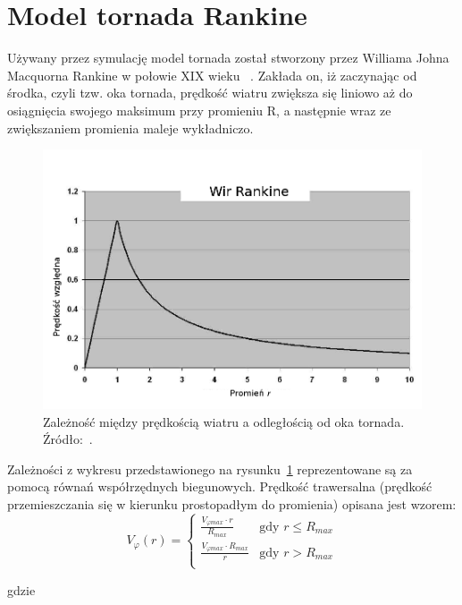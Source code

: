\section{Model tornada Rankine}

Używany przez symulację model tornada został stworzony przez Williama Johna Macquorna Rankine  w połowie XIX wieku ~\cite{dbg_vortex}. Zakłada on, iż zaczynając od środka, czyli tzw. oka tornada, prędkość wiatru zwiększa się liniowo aż do osiągnięcia swojego maksimum przy promieniu R, a następnie wraz ze zwiększaniem promienia maleje wykładniczo. 

\begin{figure}[!h]
	\center
	\includegraphics[scale=0.45]{rankine1}
	\caption{Zależność między prędkością wiatru a odległością od oka tornada. Źródło:~\cite{ktk_vortex}.}
	\label{fig:rankine1}
\end{figure} 

Zależności z wykresu przedstawionego na rysunku~\ref{fig:rankine1} reprezentowane są za pomocą równań współrzędnych biegunowych. Prędkość trawersalna (prędkość przemieszczania się w kierunku prostopadłym do promienia) opisana jest wzorem:
\begin{equation}
V_{\varphi}(r) =  \left\{ \begin{array}{ll}
\frac{V_{\varphi  max}\cdot r}{R_{max}} & \textrm{gdy $r \leq R_{max}$}\\
\frac{V_{\varphi  max}\cdot R_{max}}{r} & \textrm{gdy $r > R_{max}$}\\
\end{array} \right.
\end{equation}

gdzie

